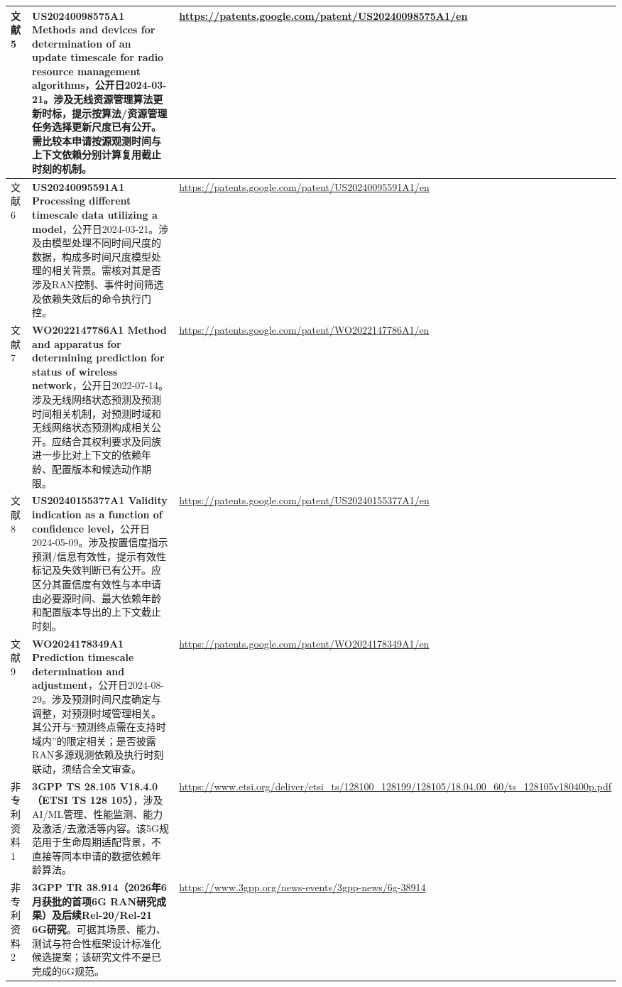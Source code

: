 \documentclass[12pt,a4paper]{article}
\begin{document}
\begin{longtable}{|p{2.5cm}|p{7.5cm}|p{4.5cm}|}
\hline
文献5 & \textbf{US20240098575A1 Methods and devices for determination of an update timescale for radio resource management algorithms}，公开日2024-03-21。\newline 涉及无线资源管理算法更新时标，提示按算法/资源管理任务选择更新尺度已有公开。需比较本申请按源观测时间与上下文依赖分别计算复用截止时刻的机制。 & \footnotesize\url{https://patents.google.com/patent/US20240098575A1/en} \\
\hline
文献6 & \textbf{US20240095591A1 Processing different timescale data utilizing a model}，公开日2024-03-21。\newline 涉及由模型处理不同时间尺度的数据，构成多时间尺度模型处理的相关背景。需核对其是否涉及RAN控制、事件时间筛选及依赖失效后的命令执行门控。 & \footnotesize\url{https://patents.google.com/patent/US20240095591A1/en} \\
\hline
文献7 & \textbf{WO2022147786A1 Method and apparatus for determining prediction for status of wireless network}，公开日2022-07-14。\newline 涉及无线网络状态预测及预测时间相关机制，对预测时域和无线网络状态预测构成相关公开。应结合其权利要求及同族进一步比对上下文的依赖年龄、配置版本和候选动作期限。 & \footnotesize\url{https://patents.google.com/patent/WO2022147786A1/en} \\
\hline
文献8 & \textbf{US20240155377A1 Validity indication as a function of confidence level}，公开日2024-05-09。\newline 涉及按置信度指示预测/信息有效性，提示有效性标记及失效判断已有公开。应区分其置信度有效性与本申请由必要源时间、最大依赖年龄和配置版本导出的上下文截止时刻。 & \footnotesize\url{https://patents.google.com/patent/US20240155377A1/en} \\
\hline
文献9 & \textbf{WO2024178349A1 Prediction timescale determination and adjustment}，公开日2024-08-29。\newline 涉及预测时间尺度确定与调整，对预测时域管理相关。其公开与“预测终点需在支持时域内”的限定相关；是否披露RAN多源观测依赖及执行时刻联动，须结合全文审查。 & \footnotesize\url{https://patents.google.com/patent/WO2024178349A1/en} \\
\hline
非专利资料1 & \textbf{3GPP TS 28.105 V18.4.0（ETSI TS 128 105）}，涉及AI/ML管理、性能监测、能力及激活/去激活等内容。\newline 该5G规范用于生命周期适配背景，不直接等同本申请的数据依赖年龄算法。 & \footnotesize\url{https://www.etsi.org/deliver/etsi_ts/128100_128199/128105/18.04.00_60/ts_128105v180400p.pdf} \\
\hline
非专利资料2 & \textbf{3GPP TR 38.914（2026年6月获批的首项6G RAN研究成果）及后续Rel-20/Rel-21 6G研究}。\newline 可据其场景、能力、测试与符合性框架设计标准化候选提案；该研究文件不是已完成的6G规范。 & \footnotesize\url{https://www.3gpp.org/news-events/3gpp-news/6g-38914} \\
\hline
\end{longtable}
\end{document}
